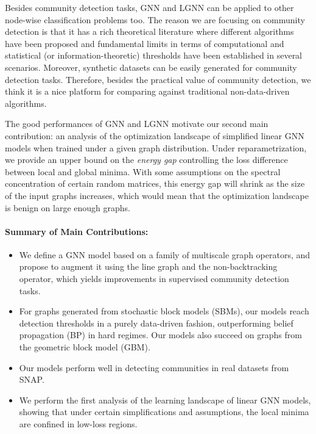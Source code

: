 \documentclass{article} \usepackage{iclr2019_conference,times}
\begin{document}
Besides community detection tasks, GNN and LGNN can be applied to other node-wise classification problems too. The reason we are focusing on community detection is that it has a rich theoretical literature where different algorithms have been proposed and fundamental limits in terms of computational and statistical (or information-theoretic) thresholds have been established in several scenarios. Moreover, synthetic datasets can be easily generated for community detection tasks. Therefore, besides the practical value of community detection, we think it is a nice platform for comparing against traditional non-data-driven algorithms.

The good performances of GNN and LGNN motivate our second main contribution: an analysis of the optimization landscape of simplified linear GNN models when trained under a given graph distribution. Under reparametrization, we provide an upper bound on the \emph{energy gap} controlling the loss difference between local and global minima. With some assumptions on the spectral concentration of certain random matrices, this energy gap will shrink as the size of the input graphs increases, which would mean that the optimization landscape is benign on large enough graphs.



\paragraph{Summary of Main Contributions:}\begin{itemize}
\item We define a GNN model based on a family of multiscale graph operators, and
propose to augment it using the line graph and the non-backtracking operator, which yields improvements in supervised community detection tasks. 
\item For graphs generated from stochastic block models (SBMs), our models reach detection thresholds in a purely data-driven fashion, outperforming belief propagation (BP) in hard regimes. Our models also succeed on graphs from the geometric block model (GBM).
\item Our models perform well in detecting communities in real datasets from SNAP.
\item We perform the first analysis of the learning landscape of linear GNN models, showing that under certain simplifications and assumptions, the local minima are confined in low-loss regions. 
\end{itemize}
\end{document}

